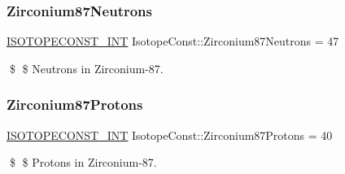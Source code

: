 \subsubsection{\texorpdfstring{Zirconium87\+Neutrons}{Zirconium87Neutrons}}
{\footnotesize\ttfamily \mbox{\hyperlink{group___isotope_const-_macros_ga5f18360b3e99483a35c32d789e62621c}{I\+S\+O\+T\+O\+P\+E\+C\+O\+N\+S\+T\+\_\+\+I\+NT}} Isotope\+Const\+::\+Zirconium87\+Neutrons = 47}

\$ \$ Neutrons in Zirconium-\/87. \mbox{\label{group___isotope_const-_zirconium-_zr87_gaf93b181fcf78e28021175dbd8de49674}} 
\subsubsection{\texorpdfstring{Zirconium87\+Protons}{Zirconium87Protons}}
{\footnotesize\ttfamily \mbox{\hyperlink{group___isotope_const-_macros_ga5f18360b3e99483a35c32d789e62621c}{I\+S\+O\+T\+O\+P\+E\+C\+O\+N\+S\+T\+\_\+\+I\+NT}} Isotope\+Const\+::\+Zirconium87\+Protons = 40}

\$ \$ Protons in Zirconium-\/87. 